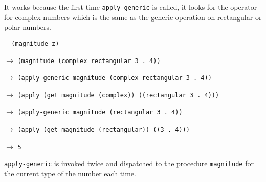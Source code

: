 \documentclass[a4paper,12pt]{article}
\begin{document}
It works because the first time \lstinline!apply-generic! is called,
it looks for the operator for complex numbers which is the same as the
generic operation on rectangular or polar numbers.

\begin{lstlisting}
  (magnitude z)
\end{lstlisting}

$\rightarrow$ \lstinline!(magnitude (complex rectangular 3 . 4))!

$\rightarrow$
\lstinline!(apply-generic magnitude (complex rectangular 3 . 4))!

$\rightarrow$
\lstinline!(apply (get magnitude (complex)) ((rectangular 3 . 4)))!

$\rightarrow$
\lstinline!(apply-generic magnitude (rectangular 3 . 4))!

$\rightarrow$
\lstinline!(apply (get magnitude (rectangular)) ((3 . 4)))!

$\rightarrow$ \lstinline!5!

\lstinline!apply-generic! is invoked twice and dispatched to the
procedure \lstinline!magnitude! for the current type of the number
each time.
\end{document}
